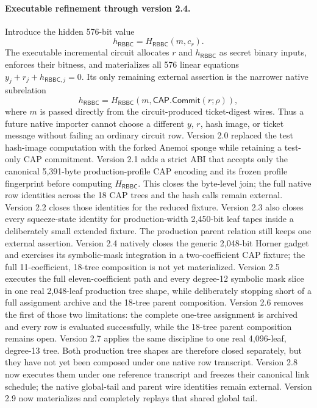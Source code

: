 \documentclass[11pt]{article}
\newcommand{\RBBC}{\mathsf{RBBC}}
\begin{document}
\paragraph{Executable refinement through version 2.4.}
Introduce the hidden 576-bit value
\[
 h_{\RBBC}=H_{\RBBC}(m,c_r).
\]
The executable incremental circuit allocates $r$ and $h_{\RBBC}$ as secret
binary inputs, enforces their bitness, and materializes all 576 linear equations
$y_j+r_j+h_{\RBBC,j}=0$.  Its only remaining external assertion is the narrower
native subrelation
\[
 h_{\RBBC}=H_{\RBBC}(m,\mathsf{CAP.Commit}(r;\rho)),
\]
where $m$ is passed directly from the circuit-produced ticket-digest wires.
Thus a future native importer cannot choose a different $y$, $r$, hash image,
or ticket message without failing an ordinary circuit row.
Version 2.0 replaced the test hash-image computation with the forked Anemoi
sponge while retaining a test-only CAP commitment.  Version 2.1 adds a strict
ABI that accepts only the canonical 5,391-byte production-profile CAP encoding
and its frozen profile fingerprint before computing $H_{\RBBC}$.  This closes
the byte-level join; the full native row identities across the 18 CAP trees and
the hash calls remain external.
Version 2.2 closes those identities for the reduced fixture.  Version 2.3 also
closes every squeeze-state identity for production-width 2,450-bit leaf tapes
inside a deliberately small extended fixture.  The production parent relation
still keeps one external assertion.  Version 2.4 natively closes the generic
2,048-bit Horner gadget and exercises its symbolic-mask integration in a
two-coefficient CAP fixture; the full 11-coefficient, 18-tree composition is
not yet materialized.  Version 2.5 executes the full eleven-coefficient path
and every degree-12 symbolic mask slice in one real 2,048-leaf production tree
shape, while deliberately stopping short of a full assignment archive and the
18-tree parent composition.  Version 2.6 removes the first of those two
limitations: the complete one-tree assignment is archived and every row is
evaluated successfully, while the 18-tree parent composition remains open.
Version 2.7 applies the same discipline to one real 4,096-leaf, degree-13
tree.  Both production tree shapes are therefore closed separately, but they
have not yet been composed under one native row transcript.  Version 2.8 now
executes them under one reference transcript and freezes their canonical link
schedule; the native global-tail and parent wire identities remain external.
Version 2.9 now materializes and completely replays that shared global tail.
\end{document}
